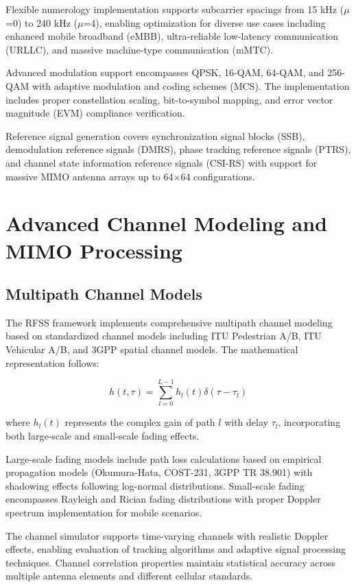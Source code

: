 \documentclass[twocolumn]{article}
\begin{document}
Flexible numerology implementation supports subcarrier spacings from 15 kHz ($\mu$=0) to 240 kHz ($\mu$=4), enabling optimization for diverse use cases including enhanced mobile broadband (eMBB), ultra-reliable low-latency communication (URLLC), and massive machine-type communication (mMTC).

Advanced modulation support encompasses QPSK, 16-QAM, 64-QAM, and 256-QAM with adaptive modulation and coding schemes (MCS). The implementation includes proper constellation scaling, bit-to-symbol mapping, and error vector magnitude (EVM) compliance verification.

Reference signal generation covers synchronization signal blocks (SSB), demodulation reference signals (DMRS), phase tracking reference signals (PTRS), and channel state information reference signals (CSI-RS) with support for massive MIMO antenna arrays up to 64$\times$64 configurations.

\section{Advanced Channel Modeling and MIMO Processing}

\subsection{Multipath Channel Models}

The RFSS framework implements comprehensive multipath channel modeling based on standardized channel models including ITU Pedestrian A/B, ITU Vehicular A/B, and 3GPP spatial channel models. The mathematical representation follows:

\begin{equation}
h(t,\tau) = \sum_{l=0}^{L-1} h_l(t) \delta(\tau - \tau_l)
\end{equation}

where $h_l(t)$ represents the complex gain of path $l$ with delay $\tau_l$, incorporating both large-scale and small-scale fading effects.

Large-scale fading models include path loss calculations based on empirical propagation models (Okumura-Hata, COST-231, 3GPP TR 38.901) with shadowing effects following log-normal distributions. Small-scale fading encompasses Rayleigh and Rician fading distributions with proper Doppler spectrum implementation for mobile scenarios.

The channel simulator supports time-varying channels with realistic Doppler effects, enabling evaluation of tracking algorithms and adaptive signal processing techniques. Channel correlation properties maintain statistical accuracy across multiple antenna elements and different cellular standards.
\end{document}
